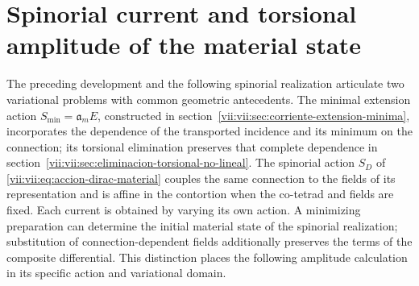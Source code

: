 
\section{Spinorial current and torsional amplitude of the material state}
\label{vii:vii:sec:corriente-espinorial-densidad}

The preceding development and the following spinorial realization articulate
two variational problems with common geometric antecedents. The
minimal extension action \(S_{\min}=\mathfrak a_m E\), constructed in
section~\ref{vii:vii:sec:corriente-extension-minima}, incorporates the
dependence of the transported incidence and its minimum on the
connection; its torsional elimination preserves that complete dependence in
section~\ref{vii:vii:sec:eliminacion-torsional-no-lineal}. The spinorial
action \(S_D\) of \eqref{vii:vii:eq:accion-dirac-material} couples the
same connection to the fields of its representation and is affine in the
contortion when the co-tetrad and fields are fixed. Each current is obtained
by varying its own action. A minimizing preparation can determine
the initial material state of the spinorial realization; substitution
of connection-dependent fields additionally preserves the terms
of the composite differential. This distinction places the following amplitude
calculation in its specific action and variational domain.

